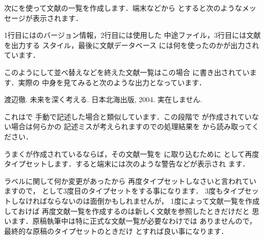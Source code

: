 次に{\JBibTeX}を使って文献の一覧を作成します．端末などから
とすると次のようなメッセージが表示されます．


1行目には{\JBibTeX}のバージョン情報，2行目には使用した
中途ファイル，3行目には文献を出力する
スタイル，最後に文献データベース 
には何を使ったのかが出力されています．

このようにして並べ替えなどを終えた文献一覧はこの場合
に書き出されています．実際の
中身を見てみると次のような出力となっています．

\begin{intext}
\begin{thebibliography}{1}
 渡辺徹.
\newblock 未来を深く考える.
\newblock 日本北海出版, 2004.
\newblock 実在しません.
\end{thebibliography} 
\end{intext}

これはで
手動で記述した場合と類似しています．この段階で
が作成されていない場合は何らかの
記述ミスが考えられますので{\JBibTeX}の処理結果を
から読み取ってください．

うまくが作成されているならば，その文献一覧を
に取り込むために
として再度タイプセットします．すると端末には次のような警告などが表示され
ます．


ラベルに関して何か変更があったから
再度タイプセットしなさいと言われていますので，
として3度目のタイプセットをする事になります．
3度もタイプセットしなければならないのは面倒かもしれませんが，
1度{\JBibTeX}によって文献一覧を作成しておけば
再度文献一覧を作成するのは新しく文献を参照したときだけだと
思います．原稿執筆中は特に正式な文献一覧が必要なわけでは
ありませんので，最終的な原稿のタイプセットのときだけ
とすれば良い事になります．


